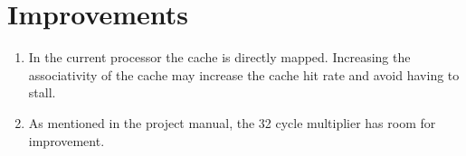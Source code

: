\documentclass[final]{article}
\begin{document}
\section{Improvements}
\label{sec:improvements}
\begin{enumerate}
\item In the current processor the cache is directly mapped. Increasing the associativity of the cache may increase the cache hit rate and avoid having to stall.
\item As mentioned in the project manual, the 32 cycle multiplier has room for improvement.
\end{enumerate}
\end{document}
